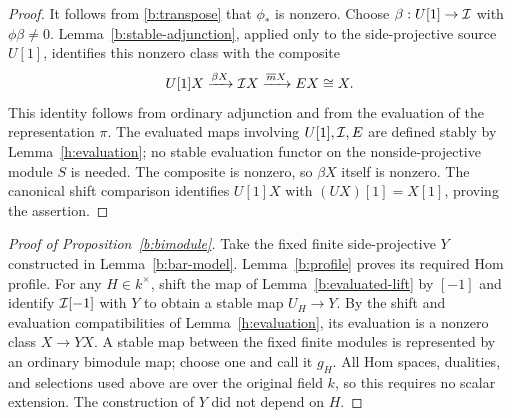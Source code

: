 \begin{proof}
It follows from \eqref{b:transpose} that \(\phi_*\) is nonzero.
Choose \(\beta:U[1]\to\mathcal I\) with \(\phi\beta\ne0\).
Lemma~\ref{b:stable-adjunction}, applied only to the
side-projective source \(U[1]\), identifies this nonzero class
with the composite
\[
 U[1]X\xrightarrow{\beta X}\mathcal I X
       \xrightarrow{\overline m X}EX\cong X .
\]
This identity follows from ordinary adjunction and from the
evaluation of the representation \(\pi\).
The evaluated maps involving \(U[1],\mathcal I,E\) are defined stably
by Lemma~\ref{h:evaluation}; no stable evaluation functor on
the nonside-projective module \(S\) is needed.
The composite is nonzero, so \(\beta X\) itself is nonzero.
The canonical shift comparison identifies \(U[1]X\) with
\((UX)[1]=X[1]\), proving the assertion.
\end{proof}

\begin{proof}[Proof of Proposition~\ref{b:bimodule}]
Take the fixed finite side-projective \(Y\) constructed in
Lemma~\ref{b:bar-model}.
Lemma~\ref{b:profile} proves its required Hom profile.
For any \(H\in k^\times\), shift the map of
Lemma~\ref{b:evaluated-lift} by \([-1]\) and identify
\(\mathcal I[-1]\) with \(Y\) to obtain a stable map \(U_H\to Y\).
By the shift and evaluation compatibilities of
Lemma~\ref{h:evaluation}, its evaluation is a nonzero class
\(X\to YX\).
A stable map between the fixed finite modules is represented
by an ordinary bimodule map; choose one and call it \(g_H\).
All Hom spaces, dualities, and selections used above are over
the original field \(k\), so this requires no scalar extension.
The construction of \(Y\) did not depend on \(H\).
\end{proof}
